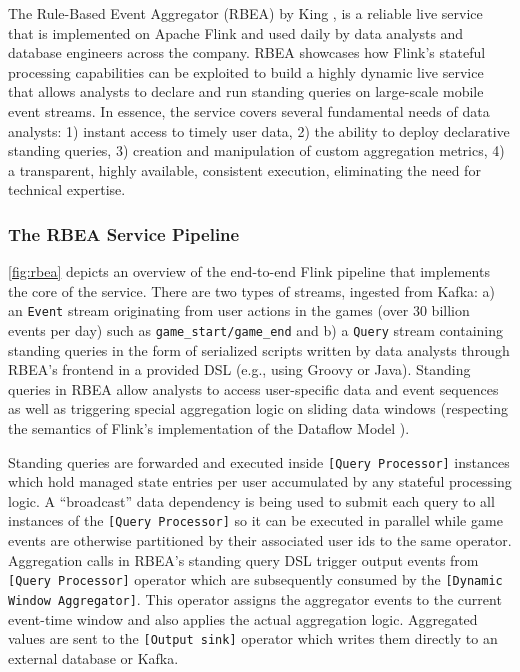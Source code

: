 The Rule-Based Event Aggregator (RBEA) by King \cite{CUSTOM:web/kingrbea}, is a reliable live service that is implemented on Apache Flink and used daily by data analysts and database engineers across the company. RBEA showcases how Flink's stateful processing capabilities can be exploited to build a highly dynamic live service that allows analysts to declare and run standing queries on large-scale mobile event streams. In essence, the service covers several fundamental needs of data analysts: 1) instant access to timely user data, 2) the ability to deploy declarative standing queries, 3) creation and manipulation of custom aggregation metrics, 4) a transparent, highly available, consistent execution, eliminating the need for technical expertise.

\subsubsection{The RBEA Service Pipeline}
\autoref{fig:rbea} depicts an overview of the end-to-end Flink pipeline that implements the core of the service. There are two types of streams, ingested from Kafka: a) an \texttt{Event} stream originating from  user actions in the games (over 30 billion events per day) such as \texttt{game\_start/game\_end} and b) a \texttt{Query} stream containing standing queries in the form of serialized scripts written by data analysts through RBEA's frontend in a provided DSL (e.g., using Groovy or Java). Standing queries in RBEA allow analysts to access user-specific data and event sequences as well as triggering special aggregation logic on sliding data windows (respecting the semantics of Flink's implementation of the Dataflow Model \cite{akidau2015dataflow}). 

Standing queries are forwarded and executed inside \texttt{[Query Processor]} instances which hold managed state entries per user accumulated by any stateful processing logic. A ``broadcast'' data dependency is being used to submit each query to all instances of the \texttt{[Query Processor]} so it can be executed in parallel while game events are otherwise partitioned by their associated user ids to the same operator. Aggregation calls in RBEA's standing query DSL trigger output events from \texttt{[Query Processor]} operator which are subsequently consumed by the \texttt{[Dynamic Window Aggregator]}. This operator assigns the aggregator events to the current event-time window and also applies the actual aggregation logic. Aggregated values are sent to the \texttt{[Output sink]} operator which writes them directly to an external database or Kafka. 

